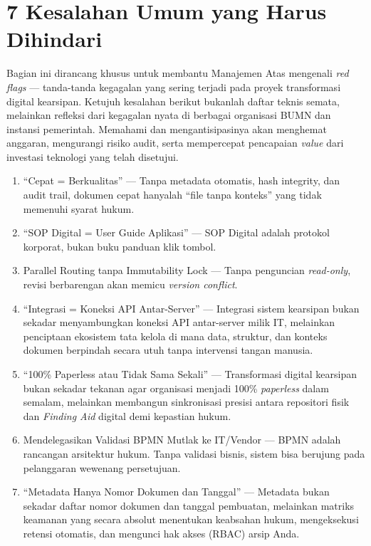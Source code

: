 \documentclass[12pt,a4paper]{report}
\begin{document}

\section{7 Kesalahan Umum yang Harus Dihindari}

Bagian ini dirancang khusus untuk membantu Manajemen Atas mengenali \textit{red flags} --- tanda-tanda kegagalan yang sering terjadi pada proyek transformasi digital kearsipan. Ketujuh kesalahan berikut bukanlah daftar teknis semata, melainkan refleksi dari kegagalan nyata di berbagai organisasi BUMN dan instansi pemerintah. Memahami dan mengantisipasinya akan menghemat anggaran, mengurangi risiko audit, serta mempercepat pencapaian \textit{value} dari investasi teknologi yang telah disetujui.
\begin{enumerate}[leftmargin=*]
    \item ``Cepat = Berkualitas'' --- Tanpa metadata otomatis, hash integrity, dan audit trail, dokumen cepat hanyalah ``file tanpa konteks'' yang tidak memenuhi syarat hukum.
    \item ``SOP Digital = User Guide Aplikasi'' --- SOP Digital adalah protokol korporat, bukan buku panduan klik tombol.
    \item Parallel Routing tanpa Immutability Lock --- Tanpa penguncian \textit{read-only}, revisi berbarengan akan memicu \textit{version conflict}.
    \item ``Integrasi = Koneksi API Antar-Server'' --- Integrasi sistem kearsipan bukan sekadar menyambungkan koneksi API antar-server milik IT, melainkan penciptaan ekosistem tata kelola di mana data, struktur, dan konteks dokumen berpindah secara utuh tanpa intervensi tangan manusia.
    \item ``100\% Paperless atau Tidak Sama Sekali'' --- Transformasi digital kearsipan bukan sekadar tekanan agar organisasi menjadi 100\% \textit{paperless} dalam semalam, melainkan membangun sinkronisasi presisi antara repositori fisik dan \textit{Finding Aid} digital demi kepastian hukum.
    \item Mendelegasikan Validasi BPMN Mutlak ke IT/Vendor --- BPMN adalah rancangan arsitektur hukum. Tanpa validasi bisnis, sistem bisa berujung pada pelanggaran wewenang persetujuan.
    \item ``Metadata Hanya Nomor Dokumen dan Tanggal'' --- Metadata bukan sekadar daftar nomor dokumen dan tanggal pembuatan, melainkan matriks keamanan yang secara absolut menentukan keabsahan hukum, mengeksekusi retensi otomatis, dan mengunci hak akses (RBAC) arsip Anda.
\end{enumerate}
\end{document}
